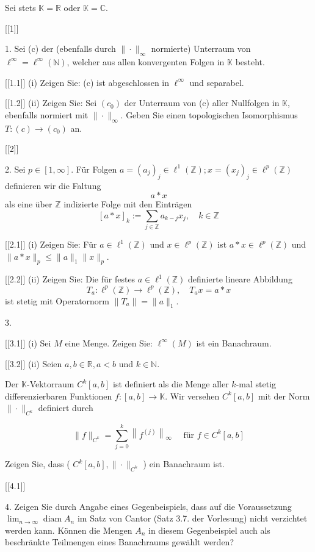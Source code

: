 


Sei stets $\mathbb{K}=\mathbb{R}$ oder $\mathbb{K}=\mathbb{C}$.


[[1]]

1. Sei (c) der (ebenfalls durch $\|\cdot\|_{\infty}$ normierte) Unterraum von $\ell^{\infty}=\ell^{\infty}(\mathbb{N})$, welcher aus allen konvergenten Folgen in $\mathbb{K}$ besteht.

[[1.1]]
(i) Zeigen Sie: (c) ist abgeschlossen in $\ell^{\infty}$ und separabel.

[[1.2]]
(ii) Zeigen Sie: Sei $\left(c_0\right)$ der Unterraum von (c) aller Nullfolgen in $\mathbb{K}$, ebenfalls normiert mit $\|\cdot\|_{\infty}$. Geben Sie einen topologischen Isomorphismus $T:(c) \rightarrow\left(c_0\right)$ an.


[[2]]

2. Sei $p \in[1, \infty]$. Für Folgen $a=\left(a_j\right)_j \in \ell^1(\mathbb{Z}) ; x=\left(x_j\right)_j \in \ell^p(\mathbb{Z})$ definieren wir die Faltung
$$
a * x
$$
als eine über $\mathbb{Z}$ indizierte Folge mit den Einträgen
$$
[a * x]_k:=\sum_{j \in \mathbb{Z}} a_{k-j} x_j, \quad k \in \mathbb{Z}
$$


[[2.1]]
(i) Zeigen Sie: Für $a \in \ell^1(\mathbb{Z})$ und $x \in \ell^p(\mathbb{Z})$ ist $a * x \in \ell^p(\mathbb{Z})$ und $\|a * x\|_p \leq\|a\|_1\|x\|_p$.

[[2.2]]
(ii) Zeigen Sie: Die für festes $a \in \ell^1(\mathbb{Z})$ definierte lineare Abbildung
$$
T_a: \ell^p(\mathbb{Z}) \rightarrow \ell^p(\mathbb{Z}), \quad T_a x=a * x
$$
ist stetig mit Operatornorm $\left\|T_a\right\|=\|a\|_1$.


3. 


[[3.1]]
(i) Sei $M$ eine Menge. Zeigen Sie: $\ell^{\infty}(M)$ ist ein Banachraum.


[[3.2]]
(ii) Seien $a, b \in \mathbb{R}, a<b$ und $k \in \mathbb{N}$.

Der $\mathbb{K}$-Vektorraum $C^k[a, b]$ ist definiert als die Menge aller $k$-mal stetig differenzierbaren Funktionen $f:[a, b] \rightarrow \mathbb{K}$. Wir versehen $C^k[a, b]$ mit der Norm $\|\cdot\|_{C^k}$ definiert durch

$$
\|f\|_{C^k}=\sum_{j=0}^k\left\|f^{(j)}\right\|_{\infty} \quad \text { für } f \in C^k[a, b]
$$


Zeigen Sie, dass ( $C^k[a, b],\|\cdot\|_{C^k}$ ) ein Banachraum ist.


[[4.1]]

4. Zeigen Sie durch Angabe eines Gegenbeispiels, dass auf die Voraussetzung $\lim _{n \rightarrow \infty} \operatorname{diam} A_n$ im Satz von Cantor (Satz 3.7. der Vorlesung) nicht verzichtet werden kann.
Können die Mengen $A_n$ in diesem Gegenbeispiel auch als beschränkte Teilmengen eines Banachraums gewählt werden?